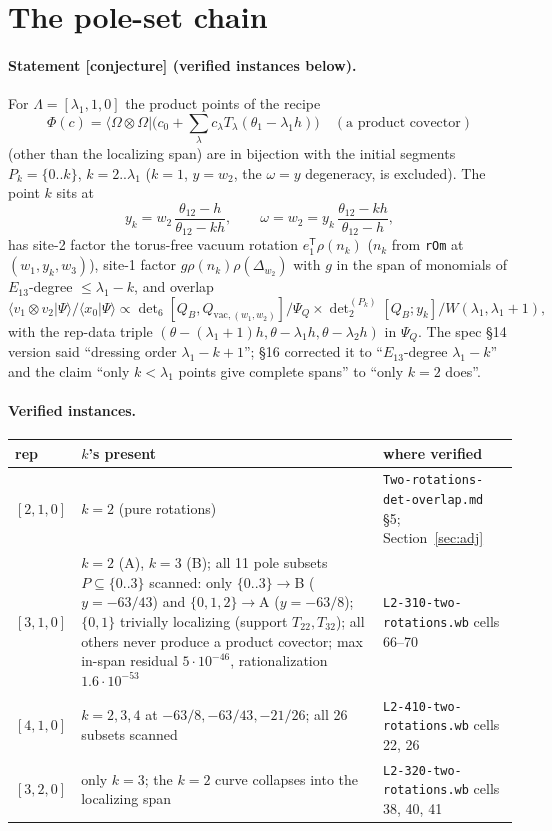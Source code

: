 \documentclass[11pt]{article}
\newcommand{\bra}[1]{\langle #1|}
\newcommand{\Om}{\Omega}
\newcommand{\vac}{\mathrm{vac}}
\newcommand{\eT}{e_1^{\mathsf T}}
\newcommand{\Tt}[1]{T_{#1}}
\newcommand{\thh}{\theta_{12}}
\newcommand{\cj}{\textbf{[conjecture]}}
\newcommand{\nb}[1]{\texttt{#1}}
\begin{document}
\section{The pole-set chain}\label{sec:chain}

\paragraph{Statement \cj{} (verified instances below).} For $\Lambda=[\lambda_1,1,0]$ the product points of the recipe
\[
\Phi(c)=\bra{\Om\otimes\Om}\Big(c_0+\sum_\lambda c_\lambda T_\lambda(\theta_1-\lambda_1h)\Big)\quad(\text{a product covector})
\]
(other than the localizing span) are in bijection with the initial segments $P_k=\{0..k\}$, $k=2..\lambda_1$ ($k=1$, $y=w_2$, the $\omega=y$ degeneracy, is excluded). The point $k$ sits at
\[
y_k=w_2\,\frac{\thh-h}{\thh-kh},\qquad\omega=w_2=y_k\,\frac{\thh-kh}{\thh-h},
\]
has site-2 factor the torus-free vacuum rotation $\eT\rho(n_k)$ ($n_k$ from \nb{rOm} at $(w_1,y_k,w_3)$), site-1 factor $g\rho(n_k)\rho(\Delta_{w_2})$ with $g$ in the span of monomials of $E_{13}$-degree $\le\lambda_1-k$, and overlap
\[
\langle v_1\otimes v_2|\Psi\rangle/\langle x_0|\Psi\rangle\propto\det\nolimits_6[Q_B,Q_{\vac,(w_1,w_2)}]/\Psi_Q\times\det\nolimits_2^{(P_k)}[Q_B;y_k]\big/W(\lambda_1,\lambda_1+1),
\]
with the rep-data triple $(\theta-(\lambda_1+1)h,\theta-\lambda_1h,\theta-\lambda_2h)$ in $\Psi_Q$. The spec \S14 version said ``dressing order $\lambda_1-k+1$''; \S16 corrected it to ``$E_{13}$-degree $\lambda_1-k$'' and the claim ``only $k<\lambda_1$ points give complete spans'' to ``only $k=2$ does''.

\paragraph{Verified instances.}
\begin{center}\small
\begin{tabular}{@{}lp{8.5cm}p{4.2cm}@{}}\toprule
rep & $k$'s present & where verified\\\midrule
$[2,1,0]$ & $k=2$ (pure rotations) & \nb{Two-rotations-det-overlap.md} \S5; Section~\ref{sec:adj}\\
$[3,1,0]$ & $k=2$ (A), $k=3$ (B); all 11 pole subsets $P\subseteq\{0..3\}$ scanned: only $\{0..3\}\to$B ($y=-63/43$) and $\{0,1,2\}\to$A ($y=-63/8$); $\{0,1\}$ trivially localizing (support $\Tt{22},\Tt{32}$); all others never produce a product covector; max in-span residual $5\cdot10^{-46}$, rationalization $1.6\cdot10^{-53}$ & \nb{L2-310-two-rotations.wb} cells 66--70\\
$[4,1,0]$ & $k=2,3,4$ at $-63/8,-63/43,-21/26$; all 26 subsets scanned & \nb{L2-410-two-rotations.wb} cells 22, 26\\
$[3,2,0]$ & only $k=3$; the $k=2$ curve collapses into the localizing span & \nb{L2-320-two-rotations.wb} cells 38, 40, 41\\\bottomrule
\end{tabular}
\end{center}
\end{document}
